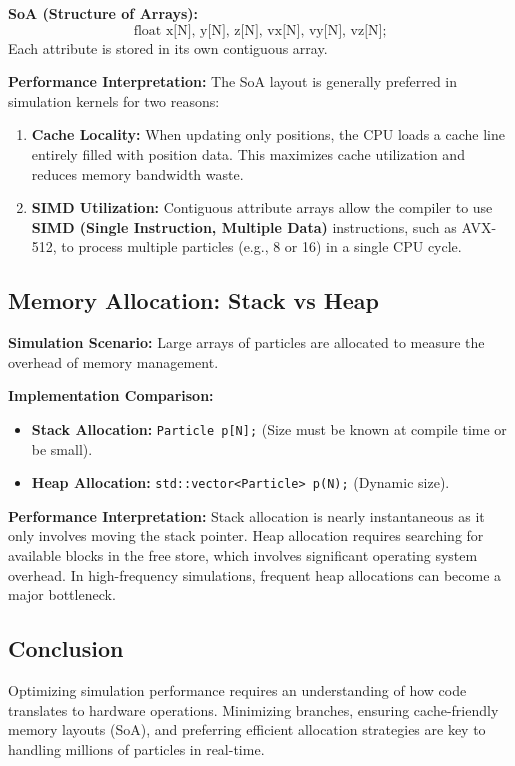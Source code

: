 \textbf{SoA (Structure of Arrays):}
\[
\text{float x[N], y[N], z[N], vx[N], vy[N], vz[N];}
\]
Each attribute is stored in its own contiguous array.

\textbf{Performance Interpretation:}
The SoA layout is generally preferred in simulation kernels for two reasons:
\begin{enumerate}
    \item \textbf{Cache Locality:} When updating only positions, the CPU loads a cache line entirely filled with position data. This maximizes cache utilization and reduces memory bandwidth waste.
    \item \textbf{SIMD Utilization:} Contiguous attribute arrays allow the compiler to use \textbf{SIMD (Single Instruction, Multiple Data)} instructions, such as AVX-512, to process multiple particles (e.g., 8 or 16) in a single CPU cycle.
\end{enumerate}

\subsection*{Memory Allocation: Stack vs Heap}

\textbf{Simulation Scenario:}
Large arrays of particles are allocated to measure the overhead of memory management.

\textbf{Implementation Comparison:}
\begin{itemize}
    \item \textbf{Stack Allocation:} \texttt{Particle p[N];} (Size must be known at compile time or be small).
    \item \textbf{Heap Allocation:} \texttt{std::vector<Particle> p(N);} (Dynamic size).
\end{itemize}

\textbf{Performance Interpretation:}
Stack allocation is nearly instantaneous as it only involves moving the stack pointer. Heap allocation requires searching for available blocks in the free store, which involves significant operating system overhead. In high-frequency simulations, frequent heap allocations can become a major bottleneck.

\subsection*{Conclusion}

Optimizing simulation performance requires an understanding of how code translates to hardware operations. Minimizing branches, ensuring cache-friendly memory layouts (SoA), and preferring efficient allocation strategies are key to handling millions of particles in real-time.
